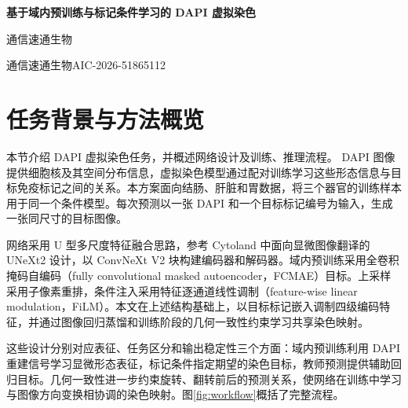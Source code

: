 \documentclass[UTF8,a4paper,zihao=5,fontset=fandol]{ctexart}
\begin{document}
\begin{center}
{\LARGE\bfseries 基于域内预训练与标记条件学习的 DAPI 虚拟染色}\par
\vspace{9pt}
{\large 通信速通生物}\par\vspace{5pt}
通信速通生物\quad AIC-2026-51865112\par
\vspace{9pt}
\end{center}


\begin{abstract}
针对结肠、肝脏和胃组织的 DAPI 虚拟染色任务，本文构建以目标标记为条件的共享预测网络。网络以 ConvNeXt V2 为主干，通过跳跃连接与像素重排恢复分辨率，并以目标标记嵌入调制多尺度编码特征。完整流程包括按组织区域划分数据、DAPI 域内掩码重建预训练、ROI 留出教师监督训练与目标生成，以及全量学生监督训练。学生先学习真实标签，再结合教师预测与几何一致性约束优化染色映射；推理使用固定学生模型，从完整单张 DAPI 生成指定标记图像。结肠与胃选择 CD68，肝脏选择 CD45RO。在固定 ROI 验证划分上，引入蒸馏后的综合分数为 76.2247，加入并加强几何一致性约束后达到 76.2807。最终全量学生的平台加权分数为 74.0677，结肠、肝脏和胃的分数分别为 73.1963、78.7011 和 72.8684。
\end{abstract}

\section{任务背景与方法概览}\label{sec:overview}
本节介绍 DAPI 虚拟染色任务，并概述网络设计及训练、推理流程。
DAPI 图像提供细胞核及其空间分布信息，虚拟染色模型通过配对训练学习这些形态信息与目标免疫标记之间的关系。本方案面向结肠、肝脏和胃数据，将三个器官的训练样本用于同一个条件模型。每次预测以一张 DAPI 和一个目标标记编号为输入，生成一张同尺寸的目标图像。

网络采用 U 型多尺度特征融合思路\cite{unet}，参考 Cytoland 中面向显微图像翻译的 UNeXt2 设计\cite{cytoland}，以 ConvNeXt V2 块构建编码器和解码器\cite{convnext}。域内预训练采用全卷积掩码自编码（fully convolutional masked autoencoder，FCMAE）目标。上采样采用子像素重排\cite{espcn}，条件注入采用特征逐通道线性调制（feature-wise linear modulation，FiLM）\cite{film}。本文在上述结构基础上，以目标标记嵌入调制四级编码特征，并通过图像回归蒸馏和训练阶段的几何一致性约束学习共享染色映射。

这些设计分别对应表征、任务区分和输出稳定性三个方面：域内预训练利用 DAPI 重建信号学习显微形态表征，标记条件指定期望的染色目标，教师预测提供辅助回归目标。几何一致性进一步约束旋转、翻转前后的预测关系，使网络在训练中学习与图像方向变换相协调的染色映射。图\ref{fig:workflow}概括了完整流程。
\end{document}
